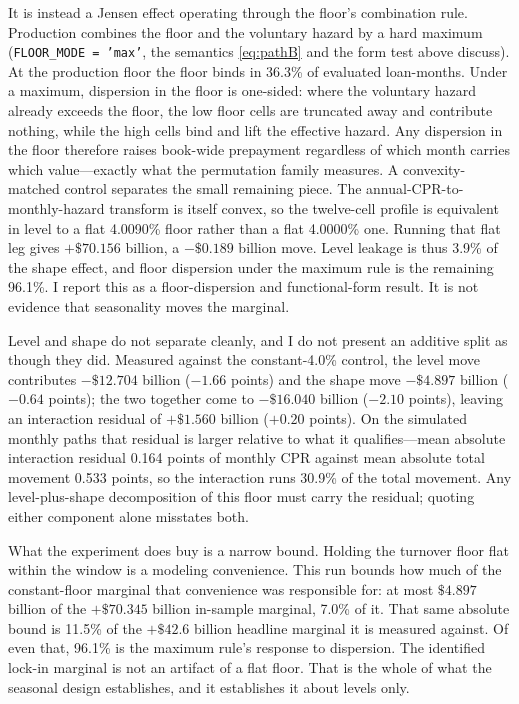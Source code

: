 \documentclass[12pt]{article}
\begin{document}
It is instead a Jensen effect operating through the floor's combination rule. Production combines the floor and the voluntary hazard by a hard maximum (\texttt{FLOOR\_MODE = 'max'}, the semantics \eqref{eq:pathB} and the form test above discuss). At the production floor the floor binds in 36.3\% of evaluated loan-months. Under a maximum, dispersion in the floor is one-sided: where the voluntary hazard already exceeds the floor, the low floor cells are truncated away and contribute nothing, while the high cells bind and lift the effective hazard. Any dispersion in the floor therefore raises book-wide prepayment regardless of which month carries which value---exactly what the permutation family measures. A convexity-matched control separates the small remaining piece. The annual-CPR-to-monthly-hazard transform is itself convex, so the twelve-cell profile is equivalent in level to a flat 4.0090\% floor rather than a flat 4.0000\% one. Running that flat leg gives $+\$70.156$ billion, a $-\$0.189$ billion move. Level leakage is thus 3.9\% of the shape effect, and floor dispersion under the maximum rule is the remaining 96.1\%. I report this as a floor-dispersion and functional-form result. It is not evidence that seasonality moves the marginal.

Level and shape do not separate cleanly, and I do not present an additive split as though they did. Measured against the constant-4.0\% control, the level move contributes $-\$12.704$ billion ($-1.66$ points) and the shape move $-\$4.897$ billion ($-0.64$ points); the two together come to $-\$16.040$ billion ($-2.10$ points), leaving an interaction residual of $+\$1.560$ billion ($+0.20$ points). On the simulated monthly paths that residual is larger relative to what it qualifies---mean absolute interaction residual 0.164 points of monthly CPR against mean absolute total movement 0.533 points, so the interaction runs 30.9\% of the total movement. Any level-plus-shape decomposition of this floor must carry the residual; quoting either component alone misstates both.

What the experiment does buy is a narrow bound. Holding the turnover floor flat within the window is a modeling convenience. This run bounds how much of the constant-floor marginal that convenience was responsible for: at most $\$4.897$ billion of the $+\$70.345$ billion in-sample marginal, 7.0\% of it. That same absolute bound is 11.5\% of the $+\$42.6$ billion headline marginal it is measured against. Of even that, 96.1\% is the maximum rule's response to dispersion. The identified lock-in marginal is not an artifact of a flat floor. That is the whole of what the seasonal design establishes, and it establishes it about levels only.
\end{document}
